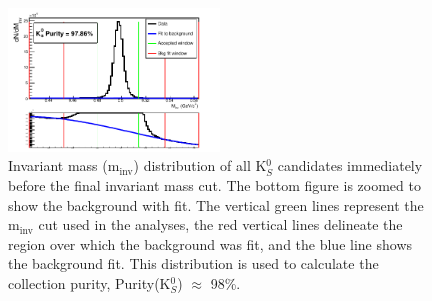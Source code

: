 \documentclass[../AnalysisNoteJBuxton.tex]{subfiles}
\begin{document}
\begin{figure}[h]
  \centering
  \includegraphics[width=0.5\textwidth]{3_DataSelection/Figures/K0Purity_LamK0.pdf}
  \caption[K$^{0}_{S}$ Purity]{Invariant mass (m$_{\mathrm{inv}}$) distribution of all K$^{0}_{S}$ candidates immediately before the final invariant mass cut.  The bottom figure is zoomed to show the background with fit.  The vertical green lines represent the m$_{\mathrm{inv}}$ cut used in the analyses, the red vertical lines delineate the region over which the background was fit, and the blue line shows the background fit.  This distribution is used to calculate the collection purity, Purity(K$^{0}_{S}$) $\approx$ 98\%.}
  \label{fig:K0Purity}
\end{figure}
\end{document}
